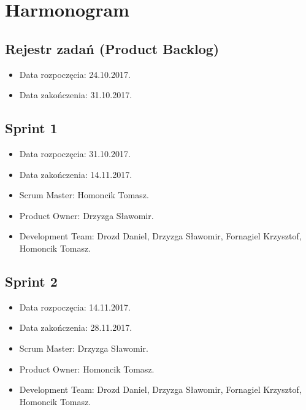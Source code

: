 	


\section{Harmonogram}
	\subsection{Rejestr zadań (Product Backlog)}
	\begin{itemize}
		\item Data rozpoczęcia: 24.10.2017.
		\item  Data zakończenia: 31.10.2017.
	\end{itemize}
	
	\subsection{Sprint 1}
	\begin{itemize}
	\item Data rozpoczęcia: 31.10.2017.
	\item Data zakończenia: 14.11.2017.
	\item Scrum Master: Homoncik Tomasz.
	\item Product Owner: Drzyzga Sławomir.
	\item Development Team: Drozd Daniel, Drzyzga Sławomir, Fornagiel Krzysztof, Homoncik Tomasz.
	\end{itemize}

	\subsection{Sprint 2}
	\begin{itemize}
		\item Data rozpoczęcia: 14.11.2017.
		\item Data zakończenia: 28.11.2017.
		\item Scrum Master: Drzyzga Sławomir.
		\item Product Owner: Homoncik Tomasz.
		\item Development Team: Drozd Daniel, Drzyzga Sławomir, Fornagiel Krzysztof, Homoncik Tomasz.
	\end{itemize}

